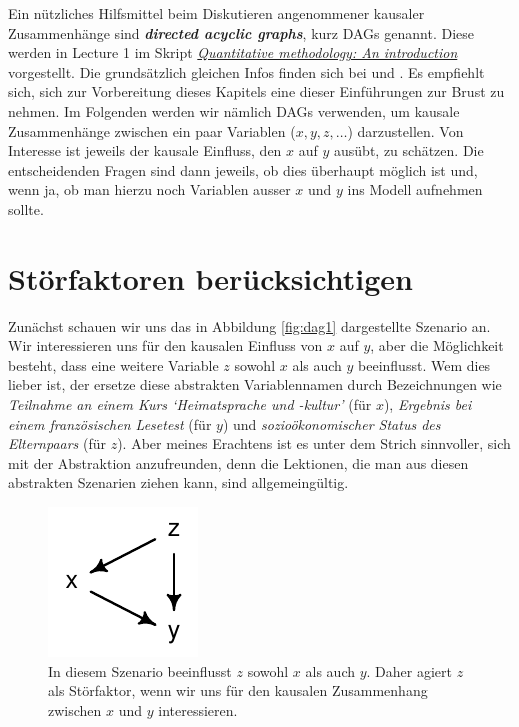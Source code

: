 \documentclass[oneside, 10pt]{book}\usepackage[]{graphicx}\usepackage[]{xcolor}
\newenvironment{knitrout}{}{} %
\begin{document}
\medskip

Ein nützliches Hilfsmittel beim Diskutieren angenommener
kausaler Zusammenhänge sind 
\textbf{\textit{directed acyclic graphs}},
kurz DAGs genannt. Diese werden in Lecture 1 im Skript
\href{https://janhove.github.io/teaching/2020/12/16/quant-meth}{\textit{Quantitative methodology: An introduction}} vorgestellt. Die grundsätzlich gleichen Infos 
finden sich bei \citet{Rohrer2018} und \citet{McElreath2020}. 
Es empfiehlt sich,
sich zur Vorbereitung dieses Kapitels eine dieser
Einführungen zur Brust zu nehmen.
Im Folgenden werden wir nämlich DAGs verwenden, um 
kausale Zusammenhänge zwischen ein paar Variablen
($x, y, z, \dots$) darzustellen. Von Interesse ist 
jeweils der kausale
Einfluss, den $x$ auf $y$ ausübt, zu schätzen. Die entscheidenden
Fragen sind dann jeweils, ob dies überhaupt möglich ist und, wenn ja, ob
man hierzu noch Variablen ausser $x$ und $y$ ins Modell
aufnehmen sollte. 

\section{Störfaktoren berücksichtigen}\label{sec:störfaktoren}
Zunächst schauen wir uns das in Abbildung \ref{fig:dag1} dargestellte Szenario an.
Wir interessieren uns für den kausalen Einfluss von $x$ auf $y$,
aber die Möglichkeit besteht, dass eine weitere Variable $z$ sowohl $x$ als auch
$y$ beeinflusst. Wem dies lieber ist, der ersetze diese abstrakten Variablennamen
durch Bezeichnungen wie
\textit{Teilnahme an einem Kurs `Heimatsprache und -kultur'} (für $x$),
\textit{Ergebnis bei einem französischen Lesetest} (für $y$)
und \textit{sozioökonomischer Status des Elternpaars} (für $z$).
Aber meines Erachtens ist es unter dem Strich sinnvoller, sich mit der
Abstraktion anzufreunden, denn die Lektionen, die man aus diesen abstrakten
Szenarien ziehen kann, sind allgemeingültig.

\begin{knitrout}
\color{fgcolor}\begin{figure}[tp]

{\centering \includegraphics[width=.2\textwidth]{figs/unnamed-chunk-301-1} 

}

\caption{In diesem Szenario beeinflusst $z$ sowohl $x$ als auch $y$. Daher agiert $z$ als Störfaktor, wenn wir uns für den kausalen Zusammenhang zwischen $x$ und $y$ interessieren.\label{fig:dag1}}\label{fig:unnamed-chunk-301}
\end{figure}

\end{knitrout}
\end{document}
